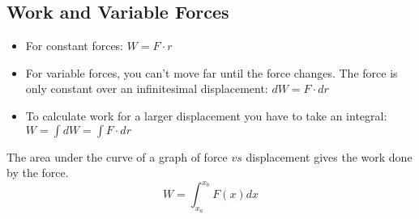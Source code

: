 \subsection{Work and Variable Forces}
\begin{itemize}
	\item For constant forces: $W=F\cdot r$
	\item For variable forces, you can't move far until the force changes. The force is only constant over an infinitesimal displacement: $dW=F\cdot dr$
	\item To calculate work for a larger displacement you have to take an integral: $W=\int dW=\int F\cdot dr$
\end{itemize}

The area under the curve of a graph of force $vs$ displacement gives the work done by the force.
\[W=\int^{x_b}_{x_a}F(x) dx\]